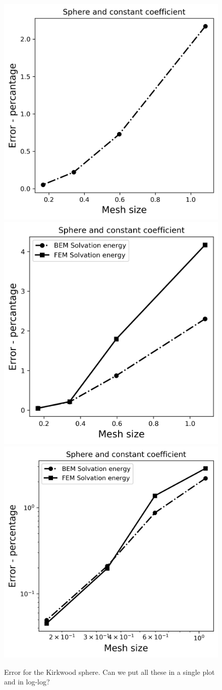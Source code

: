 \begin{figure}
  \centering
  \includegraphics[width=0.45\linewidth]{BEM_BEM_Sphere_const_coeff_error.png}
  \includegraphics[width=0.45\linewidth]{FEM_BEM_Sphere_const_coeff_error.png}
  \includegraphics[width=0.45\linewidth]{Hybrid_FEM_BEM_Sphere_const_coeff_error.png}
  \caption{Error for the Kirkwood sphere. Can we put all these in a single plot and in log-log?}
  \label{fig:error_sphere}
\end{figure}

